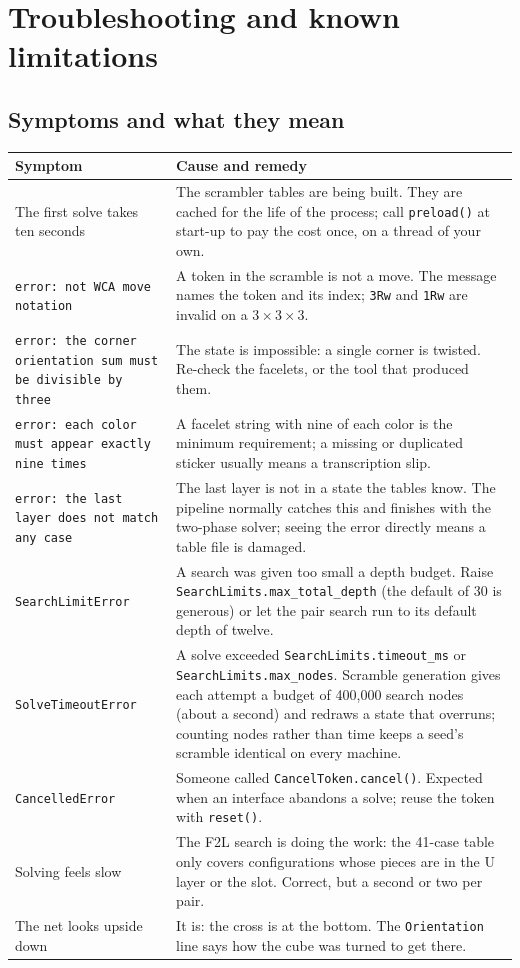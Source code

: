 \section{Troubleshooting and known limitations}
\label{sec:trouble}

\subsection{Symptoms and what they mean}

\begin{longtable}{@{}p{5.4cm}p{9cm}@{}}
\toprule
Symptom & Cause and remedy \\
\midrule
\endhead
The first solve takes ten seconds & The scrambler tables are being built.  They are
cached for the life of the process; call \texttt{preload()} at start-up to pay the
cost once, on a thread of your own. \\
\texttt{error: not WCA move notation} & A token in the scramble is not a move.  The
message names the token and its index; \texttt{3Rw} and \texttt{1Rw} are invalid on
a $3\times3\times3$. \\
\texttt{error: the corner orientation sum must be divisible by three} & The state is
impossible: a single corner is twisted.  Re-check the facelets, or the tool that
produced them. \\
\texttt{error: each color must appear exactly nine times} & A facelet string with
nine of each color is the minimum requirement; a missing or duplicated sticker
usually means a transcription slip. \\
\texttt{error: the last layer does not match any case} & The last layer is not in a
state the tables know.  The pipeline normally catches this and finishes with the
two-phase solver; seeing the error directly means a table file is damaged. \\
\texttt{SearchLimitError} & A search was given too small a depth budget.  Raise
\texttt{SearchLimits.max\_total\_depth} (the default of 30 is generous) or let the
pair search run to its default depth of twelve. \\
\texttt{SolveTimeoutError} & A solve exceeded \texttt{SearchLimits.timeout\_ms} or
\texttt{SearchLimits.max\_nodes}.  Scramble generation gives each attempt a budget of
400,000 search nodes (about a second) and redraws a state that overruns; counting
nodes rather than time keeps a seed's scramble identical on every machine. \\
\texttt{CancelledError} & Someone called \texttt{CancelToken.cancel()}.  Expected
when an interface abandons a solve; reuse the token with \texttt{reset()}. \\
Solving feels slow & The F2L search is doing the work: the 41-case table only
covers configurations whose pieces are in the U layer or the slot.  Correct, but a
second or two per pair. \\
The net looks upside down & It is: the cross is at the bottom.  The
\texttt{Orientation} line says how the cube was turned to get there. \\
\bottomrule
\end{longtable}

